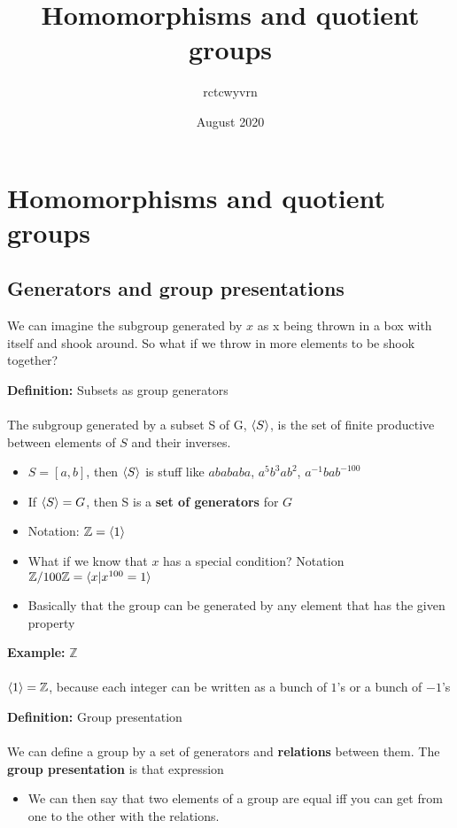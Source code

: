 \documentclass{article}
\title{Homomorphisms and quotient groups}
\author{rctcwyvrn}
\date{August 2020}
\newcommand{\Z}{\mathbb{Z}}
\begin{document}
\maketitle


\section{Homomorphisms and quotient groups}
\subsection{Generators and group presentations}
We can imagine the subgroup generated by $x$ as x being thrown in a box with itself and shook around. So what if we throw in more elements to be shook together? 
\begin{definition} 
\textbf{Definition:} Subsets as group generators \\
~\\
The subgroup generated by a subset S of G, $\braket{S}$, is the set of finite productive between elements of $S$ and their inverses. 
\begin{itemize}
	\item $S = [a,b]$, then $\braket{S}$ is stuff like $abababa$, $a^5b^3ab^2$, $a^{-1}bab^{-100}$
	\item If $\braket{S}=G$, then S is a {\color{blue} \textbf{set of generators}} for $G$
	\item Notation: $\Z= \braket{1}$ 
	\item What if we know that $x$ has a special condition? Notation $\Z/{100\Z} = \braket{x | x^{100} = 1}$ 
	\item Basically that the group can be generated by any element that has the given property
\end{itemize}
\end{definition}
\begin{example} 
\textbf{Example:} $\Z$ \\
~\\
$\braket{1} = \Z$, because each integer can be written as a bunch of $1$'s or a bunch of $-1$'s
\end{example}
\newpage
\begin{definition} 
\textbf{Definition:} Group presentation \\
~\\
We can define a group by a set of generators and {\color{blue} \textbf{relations}} between them. The {\color{blue} \textbf{group presentation}} is that expression 
\begin{itemize}
	\item We can then say that two elements of a group are equal iff you can get from one to the other with the relations.
\end{itemize}
\end{definition}
\end{document}
